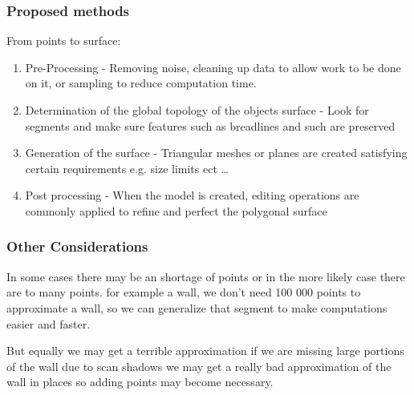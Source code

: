 \subsubsection{Proposed methods}


From points to surface:

\begin{enumerate}
\item Pre-Processing - Removing noise, cleaning up data to allow work to be done on it, or sampling to reduce computation time.

\item Determination of the global topology of the objects surface - Look for segments and make sure features such as breadlines and such are preserved
	
\item Generation of the surface - Triangular meshes or planes are created satisfying certain requirements e.g. size limits ect \ldots

\item Post processing - When the model is created, editing operations are commonly applied to refine and perfect the polygonal surface
\end{enumerate}

\subsubsection{Other Considerations}

In some cases there may be an shortage of points or in the more likely case there are to many points. for example a wall, we don't need 100 000 points to approximate a wall, so we can generalize that segment to make computations easier and faster.

But equally we may get a terrible approximation if we are missing large portions of the wall due to scan shadows we may get a really bad approximation of the wall in places so adding points may become necessary.



